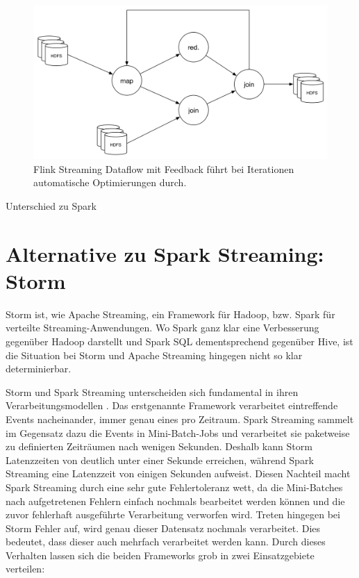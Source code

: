 \begin{figure}[htb!]
\centering
\includegraphics[width=1.0\textwidth]{bilder/flink.png}
\caption{Flink Streaming Dataflow mit Feedback führt bei Iterationen automatische Optimierungen durch.}
\label{fig:flink}
\end{figure} 

Unterschied zu Spark 



\section{Alternative zu Spark Streaming: Storm}
\label{section:storm}


Storm ist, wie Apache Streaming, ein Framework für Hadoop, bzw. Spark für verteilte Streaming-Anwendungen. Wo Spark ganz klar eine Verbesserung gegenüber Hadoop darstellt und Spark SQL dementsprechend gegenüber Hive, ist die Situation bei Storm und Apache Streaming hingegen nicht so klar determinierbar. 

Storm und Spark Streaming unterscheiden sich fundamental in ihren Verarbeitungsmodellen . Das erstgenannte Framework verarbeitet eintreffende Events nacheinander, immer genau eines pro Zeitraum. Spark Streaming sammelt im Gegensatz dazu die Events in Mini-Batch-Jobs und verarbeitet sie paketweise zu definierten Zeiträumen nach wenigen Sekunden. Deshalb kann Storm Latenzzeiten von deutlich unter einer Sekunde erreichen, während Spark Streaming eine Latenzzeit von einigen Sekunden aufweist. Diesen Nachteil macht Spark Streaming durch eine sehr gute Fehlertoleranz wett, da die Mini-Batches nach aufgetretenen Fehlern einfach nochmals bearbeitet werden können und die zuvor fehlerhaft ausgeführte Verarbeitung verworfen wird. Treten hingegen bei Storm Fehler auf, wird genau dieser Datensatz nochmals verarbeitet. Dies bedeutet, dass dieser auch mehrfach verarbeitet werden kann. Durch dieses Verhalten lassen sich die beiden Frameworks grob in zwei Einsatzgebiete verteilen:


